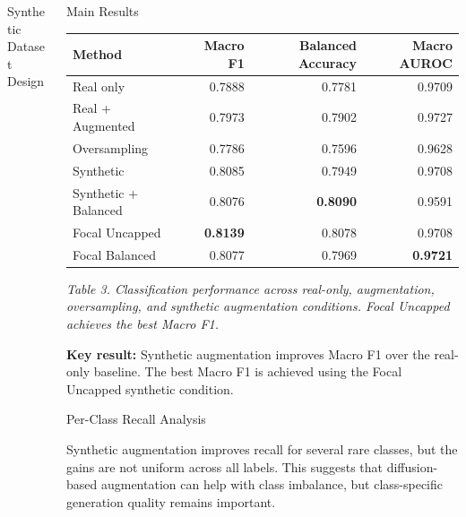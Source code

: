 \begin{frame}[t]
\begin{columns}[t]
\begin{column}{\colwidth}
\begin{block}{Synthetic Dataset Design}
\end{block}

\end{column}

\separatorcolumn

\begin{column}{\colwidth}

\begin{block}{Main Results}

\begin{center}
{\scriptsize
\renewcommand{\arraystretch}{1.12}
\begin{tabularx}{\linewidth}{@{}>{\raggedright\arraybackslash}Xrrr@{}}
\toprule
\textbf{Method} & \textbf{Macro F1} & \textbf{Balanced Accuracy} & \textbf{Macro AUROC} \\
\midrule
Real only & 0.7888 & 0.7781 & 0.9709 \\
Real + Augmented & 0.7973 & 0.7902 & 0.9727 \\
Oversampling & 0.7786 & 0.7596 & 0.9628 \\
Synthetic & 0.8085 & 0.7949 & 0.9708 \\
Synthetic + Balanced & 0.8076 & \textbf{0.8090} & 0.9591 \\
Focal Uncapped & \textbf{0.8139} & 0.8078 & 0.9708 \\
Focal Balanced & 0.8077 & 0.7969 & \textbf{0.9721} \\
\bottomrule
\end{tabularx}
}
\par\smallskip
{\footnotesize\itshape Table 3. Classification performance across real-only, augmentation, oversampling, and synthetic augmentation conditions. Focal Uncapped achieves the best Macro F1.\par}
\end{center}

\textbf{Key result:} Synthetic augmentation improves Macro F1 over the real-only baseline. The best Macro F1 is achieved using the Focal Uncapped synthetic condition.

\end{block}

\begin{block}{Per-Class Recall Analysis}

Synthetic augmentation improves recall for several rare classes, but the gains are not uniform across all labels. This suggests that diffusion-based augmentation can help with class imbalance, but class-specific generation quality remains important.


\end{block}
\end{column}
\end{columns}
\end{frame}

